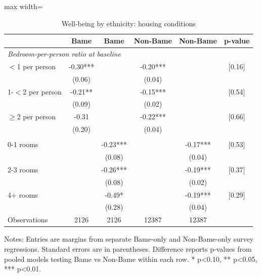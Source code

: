 \begin{table}[htbp]
\centering
\caption{Well-being by ethnicity: housing conditions}
\small
\begin{adjustbox}{max width=\textwidth}
\begin{tabular}{p{5.3cm}ccccc}
\toprule
& Bame & Bame & Non-Bame & Non-Bame & p-value \\
\midrule
\multicolumn{6}{l}{\textit{Bedroom-per-person ratio at baseline}} \\
$<$1 per person & -0.30*** &  & -0.20*** &  & [0.16] \\
& (0.06) &  & (0.04) &  & \\
1-$<$2 per person & -0.21** &  & -0.15*** &  & [0.54] \\
& (0.09) &  & (0.02) &  & \\
$\geq$2 per person & -0.31 &  & -0.22*** &  & [0.66] \\
& (0.20) &  & (0.04) &  & \\
\addlinespace
\multicolumn{6}{l}{\textit{Other rooms at baseline}} \\
0-1 rooms &  & -0.23*** &  & -0.17*** & [0.53] \\
&  & (0.08) &  & (0.04) & \\
2-3 rooms &  & -0.26*** &  & -0.19*** & [0.37] \\
&  & (0.08) &  & (0.02) & \\
4+ rooms &  & -0.49* &  & -0.19*** & [0.29] \\
&  & (0.28) &  & (0.04) & \\
\midrule
Observations & 2126 & 2126 & 12387 & 12387 & \\
\bottomrule
\end{tabular}
\end{adjustbox}

\begin{flushleft}
\footnotesize Notes: Entries are margins from separate Bame-only and Non-Bame-only survey regressions. Standard errors are in parentheses. Difference reports p-values from pooled models testing Bame vs Non-Bame within each row. * p<0.10, ** p<0.05, *** p<0.01.
\end{flushleft}
\end{table}